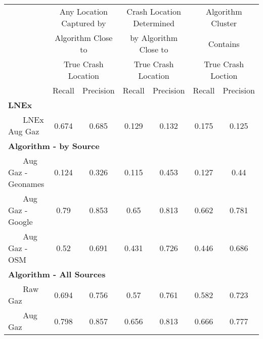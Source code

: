 \begin{tabular}{l cc | cc | cc } \hline  & \multicolumn{2}{c|}{Any Location Captured by} & \multicolumn{2}{c|}{Crash Location Determined} & \multicolumn{2}{c}{Algorithm Cluster} \\  & \multicolumn{2}{c|}{Algorithm Close to} & \multicolumn{2}{c|}{by Algorithm Close to}  & \multicolumn{2}{c}{Contains} \\  & \multicolumn{2}{c|}{True Crash Location} & \multicolumn{2}{c|}{True Crash Location}  & \multicolumn{2}{c}{True Crash Loction} \\  \hline  & Recall & Precision & Recall & Precision & Recall & Precision \\ \hline \multicolumn{3}{l|}{\bf LNEx} & & & & \\  ~~~ LNEx Aug Gaz & 0.674  &  0.685  &  0.129  &  0.132  &  0.175  &  0.125  \\ \multicolumn{3}{l|}{\bf Algorithm - by Source} & & & & \\  ~~~ Aug Gaz - Geonames & 0.124  &  0.326  &  0.115  &  0.453  &  0.127  &  0.44  \\  ~~~ Aug Gaz - Google & 0.79  &  0.853  &  0.65  &  0.813  &  0.662  &  0.781  \\  ~~~ Aug Gaz - OSM & 0.52  &  0.691  &  0.431  &  0.726  &  0.446  &  0.686  \\ \multicolumn{3}{l|}{\bf Algorithm - All Sources} & & & & \\  ~~~ Raw Gaz & 0.694  &  0.756  &  0.57  &  0.761  &  0.582  &  0.723  \\  ~~~ Aug Gaz & 0.798  &  0.857  &  0.656  &  0.813  &  0.666  &  0.777  \\ \hline \end{tabular} 